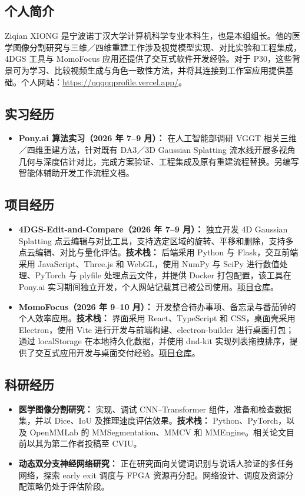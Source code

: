 \documentclass[a4paper,12pt]{article}
\begin{document}
\subsection*{个人简介}
Ziqian XIONG 是宁波诺丁汉大学计算机科学专业本科生，也是本组组长。他的医学图像分割研究与三维／四维重建工作涉及视觉模型实现、对比实验和工程集成，4DGS 工具与 MomoFocus 应用还提供了交互式软件开发经验。对于 P30，这些背景可为学习、比较视频生成与角色一致性方法，并将其连接到工作室应用提供基础。个人网站：\url{https://qqqqqprofile.vercel.app/}。

\subsection*{实习经历}
\begin{itemize}
  \item \textbf{Pony.ai 算法实习（2026 年 7--9 月）：} 在人工智能部调研 VGGT 相关三维／四维重建方法，针对既有 DA3／3D Gaussian Splatting 流水线开展多视角几何与深度估计对比，完成方案验证、工程集成及原有重建流程替换。另编写智能体辅助开发工作流程文档。
\end{itemize}

\subsection*{项目经历}
\begin{itemize}
  \item \textbf{4DGS-Edit-and-Compare（2026 年 7--9 月）：} 独立开发 4D Gaussian Splatting 点云编辑与对比工具，支持选定区域的旋转、平移和删除，支持多点云编辑、对比与量化评估。\textbf{技术栈：} 后端采用 Python 与 Flask，交互前端采用 JavaScript、Three.js 和 WebGL，使用 NumPy 与 SciPy 进行数值处理、PyTorch 与 plyfile 处理点云文件，并提供 Docker 打包配置，该工具在 Pony.ai 实习期间独立开发，个人网站记载其已被公司使用。\href{https://github.com/qianqqqqqXZQ/4DGS-Edit-and-Compare}{项目仓库}。
  \item \textbf{MomoFocus（2026 年 9--10 月）：} 开发整合待办事项、备忘录与番茄钟的个人效率应用。\textbf{技术栈：} 界面采用 React、TypeScript 和 CSS，桌面壳采用 Electron，使用 Vite 进行开发与前端构建、electron-builder 进行桌面打包；通过 localStorage 在本地持久化数据，并使用 dnd-kit 实现列表拖拽排序，提供了交互式应用开发与桌面交付经验。\href{https://github.com/qianqqqqqXZQ/MomoFocus}{项目仓库}。
\end{itemize}

\subsection*{科研经历}
\begin{itemize}
  \item \textbf{医学图像分割研究：} 实现、调试 CNN--Transformer 组件，准备和检查数据集，并以 Dice、IoU 及推理速度评估效果。\textbf{技术栈：} Python、PyTorch，以及 OpenMMLab 的 MMSegmentation、MMCV 和 MMEngine。相关论文目前以其为第二作者投稿至 CVIU。
  \item \textbf{动态双分支神经网络研究：} 正在研究面向关键词识别与说话人验证的多任务网络，探索 early exit 调度与 FPGA 资源再分配。网络设计、调度及资源分配策略仍处于评估阶段。
\end{itemize}
\end{document}

